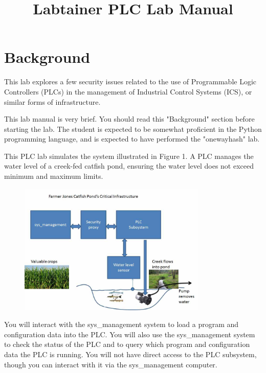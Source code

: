 \documentclass{article}
\begin{document}
\title {Labtainer PLC Lab Manual}
\maketitle

\section {Background}
This lab explores a few security issues related to the use of Programmable
Logic Controllers (PLCs) in the management of Industrial Control Systems (ICS),
or similar forms of infrastructure.

This lab manual is very brief.  You should read this "Background" section before starting the lab.
The student is expected to be somewhat proficient in the Python programming language,
and is expected to have performed the "onewayhash" lab.

This PLC lab simulates the system illustrated in Figure 1.  A PLC manages the water level
of a creek-fed catfish pond, ensuring the water level does not exceed minimum and maximum
limits.  

\begin{figure}[htb]
\begin{center}
\includegraphics [width=0.8\textwidth,natwidth=621,natheight=403]{plc.jpg}
\end{center}
\end{figure}

You will interact with the sys\_management system to load a program and configuration data
into the PLC.  You will also use the sys\_management system to check the status of the PLC
and to query which program and configuration data the PLC is running. 
You will not have direct access to the PLC subsystem, though you can
interact with it via the sys\_management computer.
\end{document}
